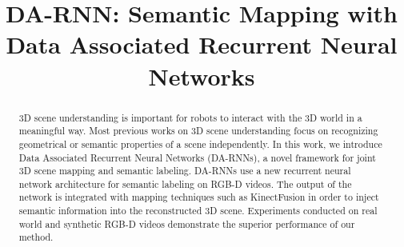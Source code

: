 \documentclass[conference]{IEEEtran}
\begin{document}
	
\title{DA-RNN: Semantic Mapping with Data Associated Recurrent Neural Networks}






% 
\author{
}

\maketitle

\begin{abstract}
3D scene understanding is important for robots to interact with the 3D world in a meaningful way. Most previous works on 3D scene understanding focus on recognizing geometrical or semantic properties of a scene independently. In this work, we introduce Data Associated Recurrent Neural Networks (DA-RNNs), a novel framework for joint 3D scene mapping and semantic labeling. DA-RNNs use a new recurrent neural network architecture for semantic labeling on RGB-D videos. The output of the network is integrated with mapping techniques such as KinectFusion in order to inject semantic information into the reconstructed 3D scene. Experiments conducted on real world and synthetic RGB-D videos demonstrate the superior performance of our method.\end{abstract}
\end{document}
